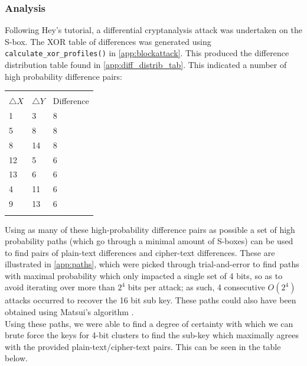 \documentclass[british,11pt,a4paper]{article}
\begin{document}
\subsubsection{Analysis}
Following Hey's tutorial, a differential cryptanalysis attack was undertaken on
the S-box. The XOR table of differences was generated using \lstinline{calculate_xor_profiles()} in \autoref{app:blockattack}. This produced the difference distribution table found in \autoref{app:diff_distrib_tab}.
This indicated a number of high probability difference pairs:

\begin{center}
	\begin{tabular}{lll}\label{tab:diffpairs} \\
		\toprule \\
		$\triangle X$ & $\triangle Y$ & Difference \\
		1 & 3 & 8 \\
    	5 & 8 & 8 \\
    	8 & 14 & 8 \\
    	12 & 5 & 6 \\
    	13 & 6 & 6 \\
    	4 & 11 & 6 \\
    	9 & 13 & 6 \\
		\bottomrule \\
	\end{tabular}
\end{center}

Using as many of these high-probability difference pairs as possible a set of high probability paths (which go through a minimal amount of S-boxes) can be used to find pairs of plain-text differences and cipher-text differences. These are illustrated in \autoref{app:paths}, which were picked through trial-and-error to find paths with maximal probability which only impacted a single set of 4 bits, so as to avoid iterating over more than \(2^4\) bits per attack; as such, 4 consecutive \(O(2^4)\) attacks occurred to recover the 16 bit sub key. These paths could also have been obtained using Matsui's algorithm \cite{matsui}. 
\\ 
Using these paths, we were able to find a degree of certainty with which we can brute force the keys for 4-bit clusters to find the sub-key which maximally agrees with the provided plain-text/cipher-text pairs. This can be seen in the table below.
\end{document}
